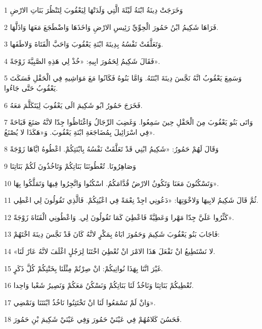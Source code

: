 \par 1 وَخَرَجَتْ دِينَةُ ابْنَةُ لَيْئَةَ الَّتِي وَلَدَتْهَا لِيَعْقُوبَ لِتَنْظُرَ بَنَاتِ الارْضِ
\par 2 فَرَاهَا شَكِيمُ ابْنُ حَمُورَ الْحِوِّيِّ رَئِيسِ الارْضِ وَاخَذَهَا وَاضْطَجَعَ مَعَهَا وَاذَلَّهَا.
\par 3 وَتَعَلَّقَتْ نَفْسُهُ بِدِينَةَ ابْنَةِ يَعْقُوبَ وَاحَبَّ الْفَتَاةَ وَلاطَفَها.
\par 4 فَقَالَ شَكِيمُ لِحَمُورَ ابِيهِ: «خُذْ لِي هَذِهِ الصَّبِيَّةَ زَوْجَةً».
\par 5 وَسَمِعَ يَعْقُوبُ انَّهُ نَجَّسَ دِينَةَ ابْنَتَهُ. وَامَّا بَنُوهُ فَكَانُوا مَعَ مَوَاشِيهِ فِي الْحَقْلِ فَسَكَتَ يَعْقُوبُ حَتَّى جَاءُوا.
\par 6 فَخَرَجَ حَمُورُ ابُو شَكِيمَ الَى يَعْقُوبَ لِيَتَكَلَّمَ مَعَهُ.
\par 7 وَاتَى بَنُو يَعْقُوبَ مِنَ الْحَقْلِ حِينَ سَمِعُوا. وَغَضِبَ الرِّجَالُ وَاغْتَاظُوا جِدّا لانَّهُ صَنَعَ قَبَاحَةً فِي اسْرَائِيلَ بِمُضَاجَعَةِ ابْنَةِ يَعْقُوبَ. وَ«هَكَذَا لا يُصْنَعُ».
\par 8 وَقَالَ لَهُمْ حَمُورُ: «شَكِيمُ ابْنِي قَدْ تَعَلَّقَتْ نَفْسُهُ بِابْنَتِكُمْ. اعْطُوهُ ايَّاهَا زَوْجَةً
\par 9 وَصَاهِرُونَا. تُعْطُونَنَا بَنَاتِكُمْ وَتَاخُذُونَ لَكُمْ بَنَاتِنَا
\par 10 وَتَسْكُنُونَ مَعَنَا وَتَكُونُ الارْضُ قُدَّامَكُمُ. اسْكُنُوا وَاتَّجِرُوا فِيهَا وَتَمَلَّكُوا بِهَا».
\par 11 ثُمَّ قَالَ شَكِيمُ لابِيهَا وَلاخْوَتِهَا: «دَعُونِي اجِدْ نِعْمَةً فِي اعْيُنِكُمْ. فَالَّذِي تَقُولُونَ لِي اعْطِي.
\par 12 كَثِّرُوا عَلَيَّ جِدّا مَهْرا وَعَطِيَّةً فَاعْطِيَ كَمَا تَقُولُونَ لِي. وَاعْطُونِي الْفَتَاةَ زَوْجَةً».
\par 13 فَاجَابَ بَنُو يَعْقُوبَ شَكِيمَ وَحَمُورَ ابَاهُ بِمَكْرٍ لانَّهُ كَانَ قَدْ نَجَّسَ دِينَةَ اخْتَهُمْ:
\par 14 «لا نَسْتَطِيعُ انْ نَفْعَلَ هَذَا الامْرَ انْ نُعْطِيَ اخْتَنَا لِرَجُلٍ اغْلَفَ لانَّهُ عَارٌ لَنَا.
\par 15 غَيْرَ انَّنَا بِهَذَا نُواتِيكُمْ: انْ صِرْتُمْ مِثْلَنَا بِخَتْنِكُمْ كُلَّ ذَكَرٍ.
\par 16 نُعْطِيكُمْ بَنَاتِنَا وَنَاخُذُ لَنَا بَنَاتِكُمْ وَنَسْكُنُ مَعَكُمْ وَنَصِيرُ شَعْبا وَاحِدا.
\par 17 وَانْ لَمْ تَسْمَعُوا لَنَا انْ تَخْتَتِنُوا نَاخُذُ ابْنَتَنَا وَنَمْضِي».
\par 18 فَحَسُنَ كَلامُهُمْ فِي عَيْنَيْ حَمُورَ وَفِي عَيْنَيْ شَكِيمَ بْنِ حَمُورَ.
